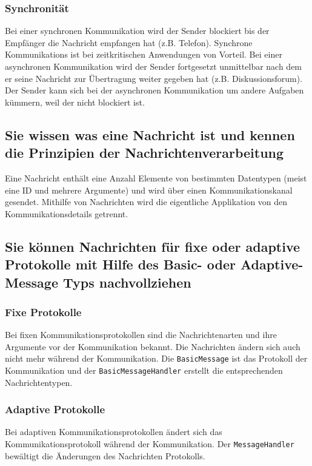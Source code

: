 \subsubsection{Synchronität}

Bei einer synchronen Kommunikation wird der Sender blockiert bis der Empfänger die Nachricht empfangen hat (z.B. Telefon). Synchrone Kommunikations ist bei zeitkritischen Anwendungen von Vorteil. Bei einer asynchronen Kommunikation wird der Sender fortgesetzt unmittelbar nach dem er seine Nachricht zur Übertragung weiter gegeben hat (z.B. Diskussionsforum). Der Sender kann sich bei der asynchronen Kommunikation um andere Aufgaben kümmern, weil der nicht blockiert ist.

\subsection{Sie wissen was eine Nachricht ist und kennen die Prinzipien der Nachrichtenverarbeitung}

Eine Nachricht enthält eine Anzahl Elemente von bestimmten Datentypen (meist eine ID und mehrere Argumente) und wird über einen Kommunikationskanal gesendet. Mithilfe von Nachrichten wird die eigentliche Applikation von den Kommunikationsdetails getrennt.

\subsection{Sie können Nachrichten für fixe oder adaptive Protokolle mit Hilfe des Basic- oder Adaptive-Message Typs nachvollziehen}

\subsubsection{Fixe Protokolle}

Bei fixen Kommunikationsprotokollen sind die Nachrichtenarten und ihre Argumente vor der Kommunikation bekannt. Die Nachrichten ändern sich auch nicht mehr während der Kommunikation. Die \texttt{BasicMessage} ist das Protokoll der Kommunikation und der \texttt{BasicMessageHandler} erstellt die entsprechenden Nachrichtentypen.

\subsubsection{Adaptive Protokolle}

Bei adaptiven Kommunikationsprotokollen ändert sich das Kommunikationsprotokoll während der Kommunikation. Der \texttt{MessageHandler} bewältigt die Änderungen des Nachrichten Protokolls.

